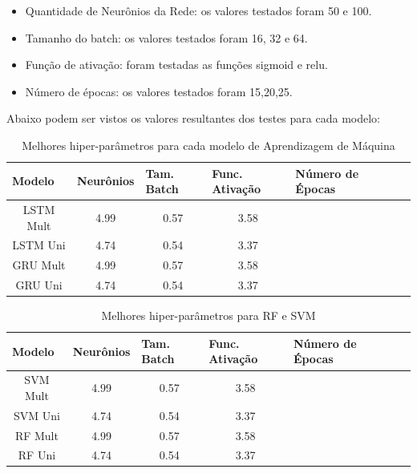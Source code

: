 \begin{itemize}
	\item Quantidade de Neurônios da Rede: os valores testados foram 50 e 100.
	\item Tamanho do batch: os valores testados foram 16, 32 e 64.
	\item Função de ativação: foram testadas as funções sigmoid e relu.
	\item Número de épocas: os valores testados foram 15,20,25.
\end{itemize}

Abaixo podem ser vistos os valores resultantes dos testes para cada modelo:

\begin{table}[htbp]
    \caption{Melhores hiper-parâmetros para cada modelo de Aprendizagem de Máquina}
    \label{table:hiper-param-lstm}
    \begin{center}
    \begin{tabular}{ccccccc}
    \hline
    \multicolumn{1}{l}{\textbf{Modelo}} & \multicolumn{1}{l}{\textbf{Neurônios}} & \multicolumn{1}{l}{\textbf{Tam. Batch}} & \multicolumn{1}{l}{\textbf{Func. Ativação}} & \multicolumn{1}{l}{\textbf{Número de Épocas}}\\
    \hline
    LSTM Mult & 4.99 &  0.57 & 3.58  \\ 
    LSTM Uni & 4.74 &  0.54 & 3.37  \\
    GRU Mult & 4.99 &  0.57 & 3.58  \\ 
    GRU Uni & 4.74 &  0.54 & 3.37  \\
    \hline
    \end{tabular}
    \end{center}
\end{table}


\begin{table}[htbp]
    \caption{Melhores hiper-parâmetros para RF e SVM}
    \label{table:hiper-param}
    \begin{center}
    \begin{tabular}{ccccccc}
    \hline
    \multicolumn{1}{l}{\textbf{Modelo}} & \multicolumn{1}{l}{\textbf{Neurônios}} & \multicolumn{1}{l}{\textbf{Tam. Batch}} & \multicolumn{1}{l}{\textbf{Func. Ativação}} & \multicolumn{1}{l}{\textbf{Número de Épocas}}\\
    \hline
    SVM Mult & 4.99 &  0.57 & 3.58  \\ 
    SVM Uni & 4.74 &  0.54 & 3.37  \\
    RF Mult & 4.99 &  0.57 & 3.58  \\ 
    RF Uni & 4.74 &  0.54 & 3.37  \\
    \hline
    \end{tabular}
    \end{center}
\end{table}


